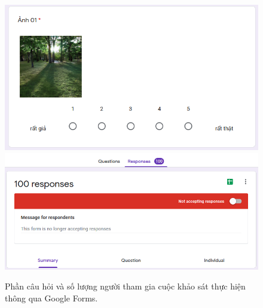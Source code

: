 \documentclass[a4paper, 12pt]{article}
\begin{document}
\begin{figure}[!h]
\captionsetup{width=0.8\textwidth}
\centering
\includegraphics[width=12cm]{images/question2.PNG}
\includegraphics[width=12cm]{images/question3.PNG}
\caption[Phần câu hỏi và số lượng người tham gia cuộc khảo sát thực hiện thông qua Google Forms.]{Phần câu hỏi và số lượng người tham gia cuộc khảo sát thực hiện thông qua Google Forms\protect\footnotemark.}
\end{figure}
\end{document}
